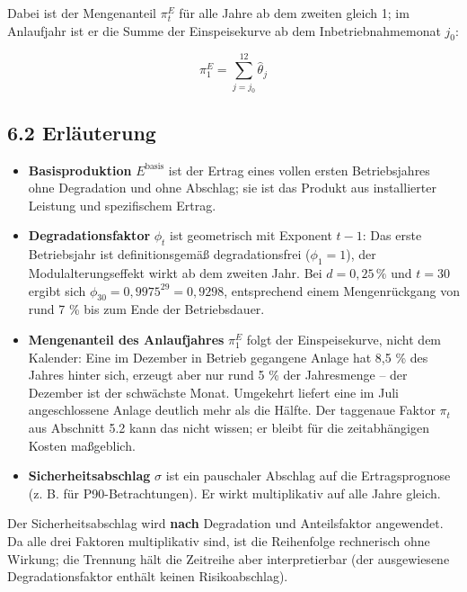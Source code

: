 \documentclass[
  a4paper,
  10pt]{article}
\providecommand{\tightlist}{%
  \setlength{\itemsep}{0pt}\setlength{\parskip}{0pt}}
\renewenvironment{quote}
  {\begin{tcolorbox}[
      enhanced,
      breakable,
      colback=Wash,
      colframe=Brand,
      boxrule=0pt,
      leftrule=2.2pt,
      arc=0pt,
      left=8pt,right=8pt,top=6pt,bottom=6pt,
      before skip=8pt,after skip=9pt
    ]\small\color{InkSoft}}
  {\end{tcolorbox}}
\begin{document}
Dabei ist der Mengenanteil \(\pi^{E}_t\) für alle Jahre ab dem zweiten
gleich 1; im Anlaufjahr ist er die Summe der Einspeisekurve ab dem
Inbetriebnahmemonat \(j_0\):

\[ \pi^{E}_1 = \sum_{j=j_0}^{12} \hat{\theta}_j \]

\hypertarget{erluxe4uterung}{%
\subsection{6.2 Erläuterung}\label{erluxe4uterung}}

\begin{itemize}
\tightlist
\item
  \textbf{Basisproduktion} \(E^{\mathrm{basis}}\) ist der Ertrag eines
  vollen ersten Betriebsjahres ohne Degradation und ohne Abschlag; sie
  ist das Produkt aus installierter Leistung und spezifischem Ertrag.
\item
  \textbf{Degradationsfaktor} \(\phi_t\) ist geometrisch mit Exponent
  \(t-1\): Das erste Betriebsjahr ist definitionsgemäß degradationsfrei
  (\(\phi_1 = 1\)), der Modulalterungseffekt wirkt ab dem zweiten Jahr.
  Bei \(d = 0{,}25\,\%\) und \(t = 30\) ergibt sich
  \(\phi_{30} = 0{,}9975^{29} = 0{,}9298\), entsprechend einem
  Mengenrückgang von rund 7 \% bis zum Ende der Betriebsdauer.
\item
  \textbf{Mengenanteil des Anlaufjahres} \(\pi^{E}_1\) folgt der
  Einspeisekurve, nicht dem Kalender: Eine im Dezember in Betrieb
  gegangene Anlage hat 8,5 \% des Jahres hinter sich, erzeugt aber nur
  rund 5 \% der Jahresmenge -- der Dezember ist der schwächste Monat.
  Umgekehrt liefert eine im Juli angeschlossene Anlage deutlich mehr als
  die Hälfte. Der taggenaue Faktor \(\pi_t\) aus Abschnitt 5.2 kann das
  nicht wissen; er bleibt für die zeitabhängigen Kosten maßgeblich.
\item
  \textbf{Sicherheitsabschlag} \(\sigma\) ist ein pauschaler Abschlag
  auf die Ertragsprognose (z. B. für P90-Betrachtungen). Er wirkt
  multiplikativ auf alle Jahre gleich.
\end{itemize}

\begin{quote}
Der Sicherheitsabschlag wird \textbf{nach} Degradation und Anteilsfaktor
angewendet. Da alle drei Faktoren multiplikativ sind, ist die
Reihenfolge rechnerisch ohne Wirkung; die Trennung hält die Zeitreihe
aber interpretierbar (der ausgewiesene Degradationsfaktor enthält keinen
Risikoabschlag).
\end{quote}
\end{document}
